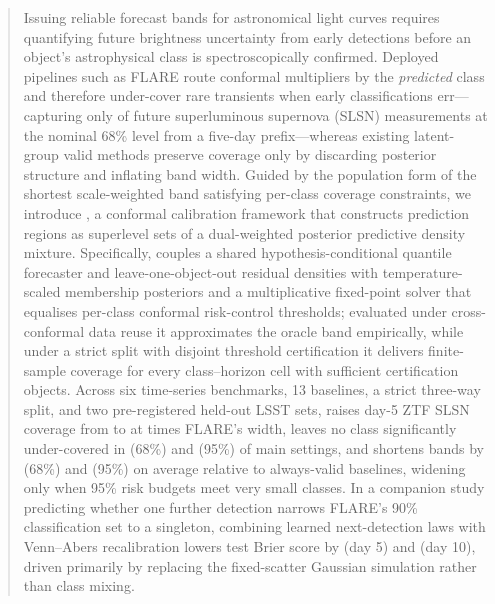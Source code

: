 \begin{abstract}
Issuing reliable forecast bands for astronomical light curves requires quantifying future brightness uncertainty from early detections before an object's astrophysical class is spectroscopically confirmed.
Deployed pipelines such as FLARE route conformal multipliers by the \emph{predicted} class and therefore under-cover rare transients when early classifications err---capturing only \ZTFflareSLSNsixtyeight{} of future superluminous supernova (SLSN) measurements at the nominal 68\% level from a five-day prefix---whereas existing latent-group valid methods preserve coverage only by discarding posterior structure and inflating band width.
Guided by the population form of the shortest scale-weighted band satisfying per-class coverage constraints, we introduce \gamut{}, a conformal calibration framework that constructs prediction regions as superlevel sets of a dual-weighted posterior predictive density mixture.
Specifically, \gamut{} couples a shared hypothesis-conditional quantile forecaster and leave-one-object-out residual densities with temperature-scaled membership posteriors and a multiplicative fixed-point solver that equalises per-class conformal risk-control thresholds; evaluated under cross-conformal data reuse it approximates the oracle band empirically, while under a strict split with disjoint threshold certification it delivers finite-sample coverage for every class--horizon cell with sufficient certification objects.
Across six time-series benchmarks, 13 baselines, a strict three-way split, and two pre-registered held-out LSST sets, \gamut{} raises day-5 ZTF SLSN coverage from \ZTFflareSLSNsixtyeight{} to \ZTFgamutSLSNsixtyeight{} at \ZTFfiveWidthRatioSixtyeight{} times FLARE's width, leaves no class significantly under-covered in \MainValidGamutSixtyeight{} (68\%) and \MainValidGamutNinetyfive{} (95\%) of main settings, and shortens bands by \WidthGainValidSixtyeight{} (68\%) and \WidthGainValidNinetyfive{} (95\%) on average relative to always-valid baselines, widening only when 95\% risk budgets meet very small classes.
In a companion study predicting whether one further detection narrows FLARE's 90\% classification set to a singleton, combining learned next-detection laws with Venn--Abers recalibration lowers test Brier score by \CloFiveBrierGainVA{} (day 5) and \CloTenBrierGainVA{} (day 10), driven primarily by replacing the fixed-scatter Gaussian simulation rather than class mixing.
\end{abstract}
